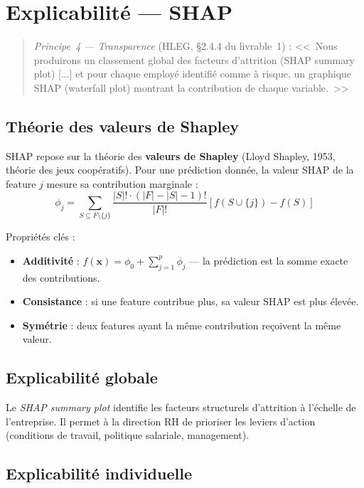 \documentclass[12pt,a4paper]{article}
\begin{document}
\section{Explicabilité --- SHAP}
\label{sec:shap}

\begin{quote}
\textit{Principe~4 --- Transparence} (HLEG, §2.4.4 du livrable~1) : <<~Nous produirons un classement global des facteurs d'attrition (SHAP summary plot) [...] et pour chaque employé identifié comme à risque, un graphique SHAP (waterfall plot) montrant la contribution de chaque variable.~>>
\end{quote}

\subsection{Théorie des valeurs de Shapley}

SHAP repose sur la théorie des \textbf{valeurs de Shapley} (Lloyd Shapley, 1953, théorie des jeux coopératifs). Pour une prédiction donnée, la valeur SHAP de la feature $j$ mesure sa contribution marginale :
$$\phi_j = \sum_{S \subseteq F \setminus \{j\}} \frac{|S|! \cdot (|F| - |S| - 1)!}{|F|!} \left[ f(S \cup \{j\}) - f(S) \right]$$

Propriétés clés :
\begin{itemize}
    \item \textbf{Additivité} : $f(\mathbf{x}) = \phi_0 + \sum_{j=1}^{p} \phi_j$ --- la prédiction est la somme exacte des contributions.
    \item \textbf{Consistance} : si une feature contribue plus, sa valeur SHAP est plus élevée.
    \item \textbf{Symétrie} : deux features ayant la même contribution reçoivent la même valeur.
\end{itemize}

\subsection{Explicabilité globale}

Le \textit{SHAP summary plot} identifie les facteurs structurels d'attrition à l'échelle de l'entreprise. Il permet à la direction RH de prioriser les leviers d'action (conditions de travail, politique salariale, management).

\subsection{Explicabilité individuelle}
\end{document}
